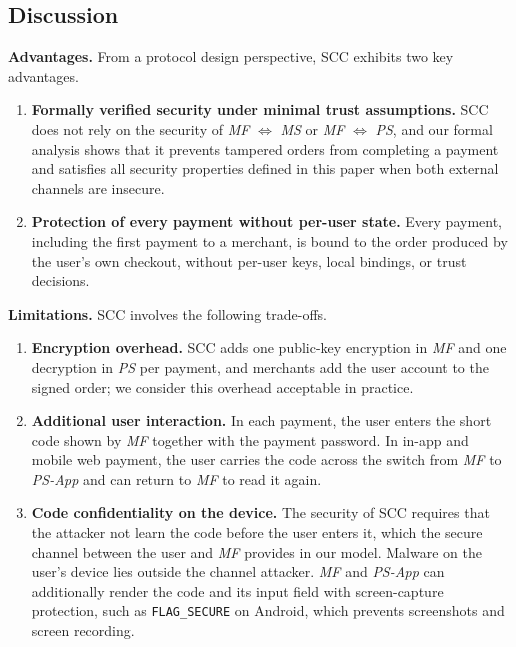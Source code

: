 \subsection{Discussion}


\textbf{Advantages.}
From a protocol design perspective, SCC exhibits two key advantages.
\begin{enumerate}[leftmargin=*]
  \item \textbf{Formally verified security under minimal trust assumptions.}
  SCC does not rely on the security of \emph{MF} $\Longleftrightarrow$ \emph{MS} or \emph{MF} $\Longleftrightarrow$ \emph{PS}, and our formal analysis shows that it prevents tampered orders from completing a payment and satisfies all security properties defined in this paper when both external channels are insecure.
  \item \textbf{Protection of every payment without per-user state.}
Every payment, including the first payment to a merchant, is bound to the order produced by the user's own checkout, without per-user keys, local bindings, or trust decisions.
\end{enumerate}

\textbf{Limitations.}
SCC involves the following trade-offs.
\begin{enumerate}[leftmargin=*]
  \item \textbf{Encryption overhead.}
SCC adds one public-key encryption in \emph{MF} and one decryption in \emph{PS} per payment, and merchants add the user account to the signed order; we consider this overhead acceptable in practice.
  \item \textbf{Additional user interaction.}
In each payment, the user enters the short code shown by \emph{MF} together with the payment password.
In in-app and mobile web payment, the user carries the code across the switch from \emph{MF} to \emph{PS-App} and can return to \emph{MF} to read it again.
  \item \textbf{Code confidentiality on the device.}
The security of SCC requires that the attacker not learn the code before the user enters it, which the secure channel between the user and \emph{MF} provides in our model.
Malware on the user's device lies outside the channel attacker.
\emph{MF} and \emph{PS-App} can additionally render the code and its input field with screen-capture protection, such as \texttt{FLAG\_SECURE} on Android, which prevents screenshots and screen recording.
\end{enumerate}
